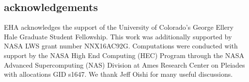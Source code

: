 \documentclass[twocolumn, amsmath, amsfonts, amssymb]{aastex62}
\begin{document}
\subsection{acknowledgements}
EHA acknowledges the support of the University of Colorado's George 
Ellery Hale Graduate Student Fellowship.
This work was additionally supported by  NASA LWS grant number NNX16AC92G.  
Computations were conducted 
with support by the NASA High End Computing (HEC) Program through the NASA 
Advanced Supercomputing (NAS) Division at Ames Research Center on Pleiades
with allocations GID s1647.
We thank  Jeff Oishi for many useful discussions. 


\end{document}
